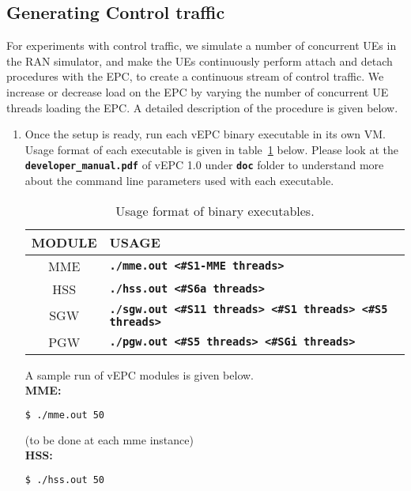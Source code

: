 \pdfminorversion=4\documentclass[hidelinks]{report}
\newcommand{\cf}[1] {
	\textbf{\texttt{#1}}
}
\begin{document}
\subsection*{Generating Control traffic}

For experiments with control traffic, we simulate a number of concurrent UEs in the RAN simulator, and make the UEs continuously perform attach and detach procedures with the EPC, to create a continuous stream of control traffic. We increase or decrease load on the EPC by varying the number of concurrent UE threads loading the EPC. A detailed description of the procedure is given below.

\begin{enumerate}

\item Once the setup is ready, run each vEPC binary executable in its own VM. Usage format of each executable is given in table~\ref{bin_format} below. Please look at the \cf{developer\_manual.pdf} of vEPC 1.0 under \cf{doc} folder to understand more about the command line parameters used with each executable.

\begin{table}[H]

\caption{Usage format of binary executables.}
\centering
\label{bin_format}
\def\arraystretch{1.5}

\begin{tabular}{|c|p{11.5 cm}|}

\hline
\textbf{MODULE} & \textbf{USAGE} \\
\hline
MME & \cf{./mme.out <\#S1-MME threads>} \\
HSS & \cf{./hss.out <\#S6a threads>} \\
SGW & \cf{./sgw.out <\#S11 threads> <\#S1 threads> <\#S5 threads>} \\
PGW & \cf{./pgw.out <\#S5 threads> <\#SGi threads>} \\
\hline

\end{tabular}

\end{table}

A sample run of vEPC modules is given below.
~\\ \textbf{MME:}

\begin{lstlisting}[language=bash]
$ ./mme.out 50 
\end{lstlisting}
(to be done at each mme instance)\\
\textbf{HSS:}
\begin{lstlisting}[language=bash]
$ ./hss.out 50 
\end{lstlisting}


\end{enumerate}
\end{document}
